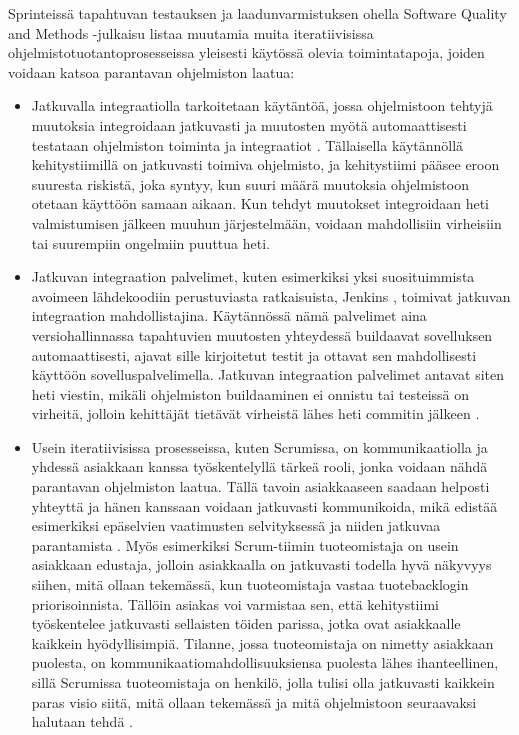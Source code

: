 \documentclass[finnish,nonumbib,nocopyright]{gradu2}
\begin{document}
Sprinteissä tapahtuvan testauksen ja laadunvarmistuksen ohella Software Quality and Methods -julkaisu \cite{agilequality} listaa muutamia muita iteratiivisissa ohjelmistotuotantoprosesseissa yleisesti käytössä olevia toimintatapoja, joiden voidaan katsoa parantavan ohjelmiston laatua:
\begin{itemize}
\item Jatkuvalla integraatiolla tarkoitetaan käytäntöä, jossa ohjelmistoon tehtyjä muutoksia integroidaan jatkuvasti ja muutosten myötä automaattisesti testataan ohjelmiston toiminta ja integraatiot \cite{ci}. Tällaisella käytännöllä kehitystiimillä on jatkuvasti toimiva ohjelmisto, ja kehitystiimi pääsee eroon suuresta riskistä, joka syntyy, kun suuri määrä muutoksia ohjelmistoon otetaan käyttöön samaan aikaan. Kun tehdyt muutokset integroidaan heti valmistumisen jälkeen muuhun järjestelmään, voidaan mahdollisiin virheisiin tai suurempiin ongelmiin puuttua heti. 
\item Jatkuvan integraation palvelimet, kuten esimerkiksi yksi suosituimmista avoimeen lähdekoodiin perustuviasta ratkaisuista, Jenkins \cite{jenkins}, toimivat jatkuvan integraation mahdollistajina. Käytännössä nämä palvelimet aina versiohallinnassa tapahtuvien muutosten yhteydessä buildaavat sovelluksen automaattisesti, ajavat sille kirjoitetut testit ja ottavat sen mahdollisesti käyttöön sovelluspalvelimella. Jatkuvan integraation palvelimet antavat siten heti viestin, mikäli ohjelmiston buildaaminen ei onnistu tai testeissä on virheitä, jolloin kehittäjät tietävät virheistä lähes heti commitin jälkeen \cite{ci}.
\item Usein iteratiivisissa prosesseissa, kuten Scrumissa, on kommunikaatiolla ja yhdessä asiakkaan kanssa työskentelyllä tärkeä rooli, jonka voidaan nähdä parantavan ohjelmiston laatua. Tällä tavoin asiakkaaseen saadaan helposti yhteyttä ja hänen kanssaan voidaan jatkuvasti kommunikoida, mikä edistää esimerkiksi epäselvien vaatimusten selvityksessä ja niiden jatkuvaa parantamista \cite{agilequality}. Myös esimerkiksi Scrum-tiimin tuoteomistaja on usein asiakkaan edustaja, jolloin asiakkaalla on jatkuvasti todella hyvä näkyvyys siihen, mitä ollaan tekemässä, kun tuoteomistaja vastaa tuotebacklogin priorisoinnista. Tällöin asiakas voi varmistaa sen, että kehitystiimi työskentelee jatkuvasti sellaisten töiden parissa, jotka ovat asiakkaalle kaikkein hyödyllisimpiä. Tilanne, jossa tuoteomistaja on nimetty asiakkaan puolesta, on kommunikaatiomahdollisuuksiensa puolesta lähes ihanteellinen, sillä Scrumissa tuoteomistaja on henkilö, jolla tulisi olla jatkuvasti kaikkein paras visio siitä, mitä ollaan tekemässä ja mitä ohjelmistoon seuraavaksi halutaan tehdä \cite{scrumguide}.
\end{itemize}
\end{document}
